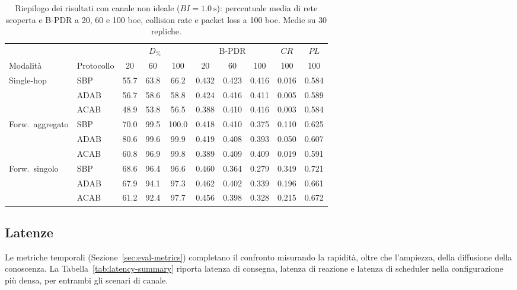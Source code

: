 \begin{table}[htbp]
  \centering
  \caption[Riepilogo dei risultati con canale non ideale]{Riepilogo dei
  risultati con canale non ideale ($BI=\SI{1.0}{\second}$): percentuale media
  di rete scoperta e B-PDR a 20, 60 e 100 boe, collision rate e packet loss a
  100 boe. Medie su 30 repliche.}
  \label{tab:error-summary}
  \small
  \begin{tabular}{llcccccccc}
    \toprule
    & & \multicolumn{3}{c}{$D_{\%}$} & \multicolumn{3}{c}{B-PDR} & $CR$ & $PL$ \\
    \cmidrule(lr){3-5}\cmidrule(lr){6-8}\cmidrule(lr){9-9}\cmidrule(lr){10-10}
    Modalit\`a & Protocollo & 20 & 60 & 100 & 20 & 60 & 100 & 100 & 100 \\
    \midrule
    \multirow{3}{*}{Single-hop}
      & SBP  & 55.7 & 63.8 & 66.2 & 0.432 & 0.423 & 0.416 & 0.016 & 0.584 \\
      & ADAB & 56.7 & 58.6 & 58.8 & 0.424 & 0.416 & 0.411 & 0.005 & 0.589 \\
      & ACAB & 48.9 & 53.8 & 56.5 & 0.388 & 0.410 & 0.416 & 0.003 & 0.584 \\
    \midrule
    \multirow{3}{*}{Forw.\ aggregato}
      & SBP  & 70.0 & 99.5 & 100.0 & 0.418 & 0.410 & 0.375 & 0.110 & 0.625 \\
      & ADAB & 80.6 & 99.6 & 99.9  & 0.419 & 0.408 & 0.393 & 0.050 & 0.607 \\
      & ACAB & 60.8 & 96.9 & 99.8  & 0.389 & 0.409 & 0.409 & 0.019 & 0.591 \\
    \midrule
    \multirow{3}{*}{Forw.\ singolo}
      & SBP  & 68.6 & 96.4 & 96.6 & 0.460 & 0.364 & 0.279 & 0.349 & 0.721 \\
      & ADAB & 67.9 & 94.1 & 97.3 & 0.462 & 0.402 & 0.339 & 0.196 & 0.661 \\
      & ACAB & 61.2 & 92.4 & 97.7 & 0.456 & 0.398 & 0.328 & 0.215 & 0.672 \\
    \bottomrule
  \end{tabular}
\end{table}

\subsection{Latenze}
\label{sec:res-latency}
Le metriche temporali (Sezione~\ref{sec:eval-metrics}) completano il
confronto misurando la rapidit\`a, oltre che l'ampiezza, della diffusione
della conoscenza. La Tabella~\ref{tab:latency-summary} riporta latenza di
consegna, latenza di reazione e latenza di scheduler nella configurazione
pi\`u densa, per entrambi gli scenari di canale.


